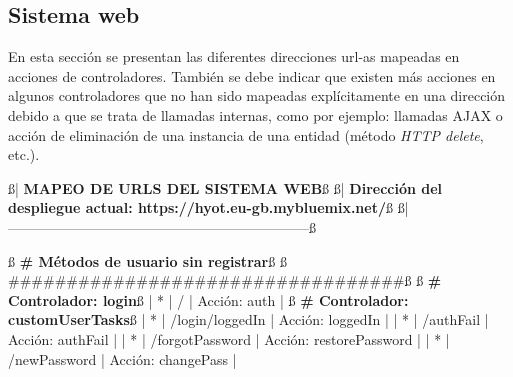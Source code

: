 \documentclass[12pt,a4paper, twoside]{report}
\begin{document}
	\subsection{Sistema web}
	
	En esta sección se presentan las diferentes direcciones \glspl{url-a} mapeadas en acciones de controladores. También se debe indicar que existen más acciones en algunos controladores que no han sido mapeadas explícitamente en una dirección debido a que se trata de llamadas internas, como por ejemplo: llamadas AJAX o acción de eliminación de una instancia de una entidad (método \textit{HTTP delete}, etc.). \\
						 
\begin{listing}[style=consola, basicstyle=\ttfamily\scriptsize, numbers=none, escapechar=ß]
ß{\color{ballblue}| \textbf{MAPEO DE URLS DEL SISTEMA WEB}}ß
ß{\color{ballblue}| \textbf{Dirección del despliegue actual: https://hyot.eu-gb.mybluemix.net/}}ß
ß{\color{ballblue}| -----------------------------------------------------------------}ß

ß\textbf{{\color{maroon} \# Métodos de usuario sin registrar}}ß
ß{\color{maroon} \#\#\#\#\#\#\#\#\#\#\#\#\#\#\#\#\#\#\#\#\#\#\#\#\#\#\#\#\#\#\#\#\#\#}ß
ß\textbf{{\color{maroon} \# Controlador: login}}ß
|  *  | /                                               | Acción: auth                                |
ß\textbf{{\color{maroon} \# Controlador: customUserTasks}}ß
|  *  | /login/loggedIn                                 | Acción: loggedIn                            |
|  *  | /authFail                                       | Acción: authFail                            |
|  *  | /forgotPassword                                 | Acción: restorePassword                     |
|  *  | /newPassword                                    | Acción: changePass                          |
 

\end{listing}
\end{document}

